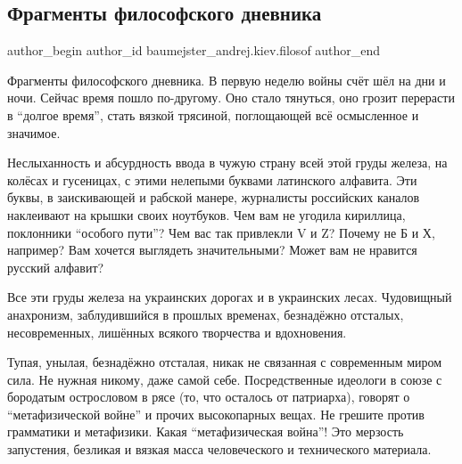  
 
 
 
 
 
\subsection{Фрагменты философского дневника}
\label{sec:08_03_2022.fb.baumejster_andrej.kiev.filosof.1.fragmenty_filosof_dnevnik}
 
\ifcmt
 author_begin
   author_id baumejster_andrej.kiev.filosof
 author_end
\fi

Фрагменты философского дневника. В первую неделю войны счёт шёл на дни и ночи.
Сейчас время пошло по-другому. Оно стало тянуться, оно грозит перерасти в
\enquote{долгое время}, стать вязкой трясиной, поглощающей всё осмысленное и значимое.

Неслыханность и абсурдность ввода в чужую страну всей этой груды железа, на
колёсах и гусеницах, с этими нелепыми буквами латинского алфавита. Эти буквы, в
заискивающей и рабской манере, журналисты российских каналов наклеивают на
крышки своих ноутбуков. Чем вам не угодила кириллица, поклонники \enquote{особого
пути}? Чем вас так привлекли V и Z? Почему не Б и Х, например? Вам хочется
выглядеть значительными? Может вам не нравится русский алфавит?

Все эти груды железа на украинских дорогах и в украинских лесах. Чудовищный
анахронизм, заблудившийся в прошлых временах, безнадёжно отсталых,
несовременных, лишённых всякого творчества и вдохновения.

Тупая, унылая, безнадёжно отсталая, никак не связанная с современным миром
сила. Не нужная никому, даже самой себе. Посредственные идеологи в союзе с
бородатым острословом в рясе (то, что осталось от патриарха), говорят о
\enquote{метафизической войне} и прочих высокопарных вещах. Не грешите против
грамматики и метафизики. Какая \enquote{метафизическая война}! Это мерзость запустения,
безликая и вязкая масса человеческого и технического материала. 

